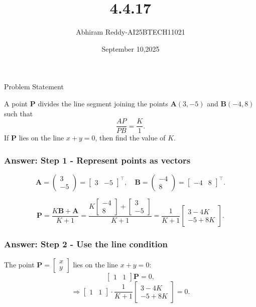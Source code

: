 \documentclass{beamer}
\title 
{4.4.17}
\date{September 10,2025}
\author 
{Abhiram Reddy-AI25BTECH11021}
\begin{document}
\frame{\titlepage}
\begin{frame}{Problem Statement}

A point \(\mathbf{P}\) divides the line segment joining the points \(\mathbf{A}(3, -5)\) and \(\mathbf{B}(-4, 8)\) such that 
\[
\frac{AP}{PB} = \frac{K}{1}.
\]
If \(\mathbf{P}\) lies on the line \(x + y = 0\), then find the value of \(K\).
\end{frame}

\begin{frame}
\frametitle{\textbf{Answer: Step 1 - Represent points as vectors}}
\[
\mathbf{A} = \begin{pmatrix} 3 \\ -5 \end{pmatrix} = \begin{bmatrix} 3 & -5 \end{bmatrix}^\top, \quad 
\mathbf{B} = \begin{pmatrix} -4 \\ 8 \end{pmatrix} = \begin{bmatrix} -4 & 8 \end{bmatrix}^\top.
\]

\[
\mathbf{P} = \frac{K \mathbf{B} + \mathbf{A}}{K + 1} = \frac{K \begin{bmatrix} -4 \\ 8 \end{bmatrix} + \begin{bmatrix} 3 \\ -5 \end{bmatrix}}{K + 1} = \frac{1}{K+1} \begin{bmatrix} 3 - 4K \\ -5 + 8K \end{bmatrix}.
\]
\end{frame}

\begin{frame}
\frametitle{\textbf{Answer: Step 2 - Use the line condition}}
The point \(\mathbf{P} = \begin{bmatrix} x \\ y \end{bmatrix}\) lies on the line \(x + y = 0\):
\[
\begin{bmatrix} 1 & 1 \end{bmatrix} \mathbf{P} = 0,
\]
\[
\Rightarrow \begin{bmatrix} 1 & 1 \end{bmatrix} \cdot \frac{1}{K+1} \begin{bmatrix} 3 - 4K \\ -5 + 8K \end{bmatrix} = 0.
\]
\end{frame}
\end{document}
